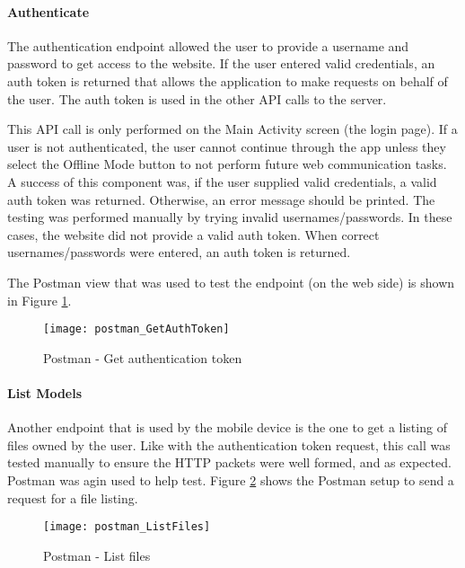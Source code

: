             \paragraph{Authenticate}

                The authentication endpoint allowed the user to provide a username and password to get access to the website.  If the user entered valid credentials, an auth token is returned that allows the application to make requests on behalf of the user.  The auth token is used in the other API calls to the server.

                This API call is only performed on the Main Activity screen (the login page).  If a user is not authenticated, the user cannot continue through the app unless they select the Offline Mode button to not perform future web communication tasks.  A success of this component was, if the user supplied valid credentials, a valid auth token was returned.  Otherwise, an error message should be printed.  The testing was performed manually by trying invalid usernames/passwords.  In these cases, the website did not provide a valid auth token.  When correct usernames/passwords were entered, an auth token is returned.

                The Postman view that was used to test the endpoint (on the web side) is shown in Figure \ref{fig:mobilePostmanGetAuthToken}.

                \begin{figure}[H]
                    \texttt{[image: postman\_GetAuthToken]}
                    \centering
                    \caption{Postman - Get authentication token}
                    \label{fig:mobilePostmanGetAuthToken}
                \end{figure}
                
            \paragraph{List Models}

                Another endpoint that is used by the mobile device is the one to get a listing of files owned by the user.  Like with the authentication token request, this call was tested manually to ensure the HTTP packets were well formed, and as expected.  Postman was agin used to help test.  Figure \ref{fig:mobilePostmanListFiles} shows the Postman setup to send a request for a file listing.  
                
                \begin{figure}[H]
                    \texttt{[image: postman\_ListFiles]}
                    \centering
                    \caption{Postman - List files}
                    \label{fig:mobilePostmanListFiles}
                \end{figure}
                
